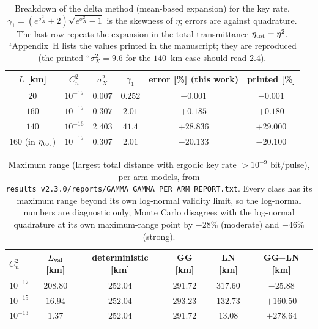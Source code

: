 \documentclass[11pt,a4paper]{article}
\theoremstyle{plain}
\theoremstyle{remark}
\begin{document}
\begin{table}[htbp]
\centering\small
\caption{Breakdown of the delta method (mean-based expansion) for the key rate. $\gamma_1=(e^{\sigma_X^2}+2)\sqrt{e^{\sigma_X^2}-1}$ is the skewness of $\eta$; errors are against quadrature. The last row repeats the expansion in the total transmittance $\eta_{\rm tot}=\eta^2$. ``Appendix~H lists the values printed in the manuscript; they are reproduced (the printed ``$\sigma_X^2=9.6$ for the $140$~km case should read $2.4$).}
\label{tab:delta}
\begin{tabular}{cccccc}
\toprule
$L$ [km] & $C_n^2$ & $\sigma_X^2$ & $\gamma_1$ & error [\%] (this work) & printed [\%]\\
\midrule
$20$ & $10^{-17}$ & $0.007$ & $0.252$ & $-0.001$ & $-0.001$ \\
$160$ & $10^{-17}$ & $0.307$ & $2.01$ & $+0.185$ & $+0.180$ \\
$140$ & $10^{-16}$ & $2.403$ & $41.4$ & $+28.836$ & $+29.000$ \\
$160$ (in $\eta_{\rm tot}$) & $10^{-17}$ & $0.307$ & $2.01$ & $-20.133$ & $-20.100$ \\

\bottomrule
\end{tabular}
\end{table}

\begin{table}[htbp]
\centering\small
\caption{Maximum range (largest total distance with ergodic key rate $>10^{-9}$ bit/pulse), per-arm models, from \texttt{results\_v2.3.0/reports/GAMMA\_GAMMA\_PER\_ARM\_REPORT.txt}. Every class has its maximum range beyond its own log-normal validity limit, so the log-normal numbers are diagnostic only; Monte Carlo disagrees with the log-normal quadrature at its own maximum-range point by $-28\%$ (moderate) and $-46\%$ (strong).}
\label{tab:range-ln}
\begin{tabular}{lccccc}
\toprule
$C_n^2$ & $L_{\rm val}$ [km] & deterministic [km] & GG [km] & LN [km] & GG$-$LN [km] \\
\midrule
$10^{-17}$ & $208.80$ & $252.04$ & $291.72$ & $317.60$ & $-25.88$ \\
$10^{-15}$ & $16.94$ & $252.04$ & $293.23$ & $132.73$ & $+160.50$ \\
$10^{-13}$ & $1.37$ & $252.04$ & $291.72$ & $13.08$ & $+278.64$ \\
\bottomrule
\end{tabular}
\end{table}
\end{document}
